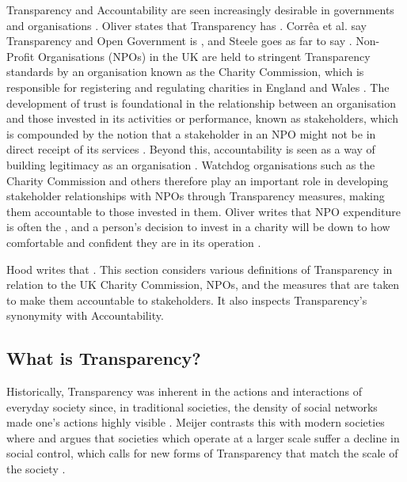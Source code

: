 Transparency and Accountability are seen increasingly desirable in governments and organisations \cite{hood_accountability_2010, oliver_what_2004, heald_fiscal_2003}. Oliver states that Transparency has  \cite{oliver_what_2004}.  Corr\^ea et al. say Transparency and Open Government is  \cite{correa_really_2014}, and Steele goes as far to say  \cite{steele_open-source_2012}.
%
Non-Profit Organisations (NPOs) in the UK are held to stringent Transparency standards by an organisation known as the Charity Commission, which is responsible for registering and regulating charities in England and Wales  \cite{hm_government_charity_????}. The development of trust is foundational in the relationship between an organisation and those invested in its activities or performance, known as stakeholders, which is compounded by the notion that a stakeholder in an NPO might not be in direct receipt of its services \cite{macmillan_relationship_2005, krashinsky_stakeholder_1997}. Beyond this, accountability is seen as a way of building legitimacy as an organisation \cite{anheier_accountability_2009}. Watchdog organisations such as the Charity Commission and others therefore play an important role in developing stakeholder relationships with NPOs through Transparency measures, making them accountable to those invested in them. Oliver writes that NPO expenditure is often the , and a person's decision to invest in a charity will be down to how comfortable and confident they are in its operation \cite{oliver_what_2004}.


Hood writes that  \cite{hood_transparency_2006-1}. This section considers various definitions of Transparency in relation to the UK Charity Commission, NPOs, and the measures that are taken to make them accountable to stakeholders. It also inspects Transparency's synonymity with Accountability.

\subsection{What is Transparency?}
Historically, Transparency was inherent in the actions and interactions of everyday society since, in traditional societies, the density of social networks made one's actions highly visible \cite{meijer_understanding_2009}. Meijer contrasts this with modern societies where  and argues that societies which operate at a larger scale suffer a decline in social control, which calls for new forms of Transparency that match the scale of the society \cite{meijer_understanding_2009}.



